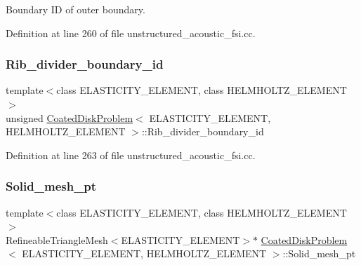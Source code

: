 Boundary ID of outer boundary. 



Definition at line 260 of file unstructured\+\_\+acoustic\+\_\+fsi.\+cc.

\mbox{\label{classCoatedDiskProblem_a0f241ef5043d002c90d68a93831e9212}} 
\subsubsection{\texorpdfstring{Rib\+\_\+divider\+\_\+boundary\+\_\+id}{Rib\_divider\_boundary\_id}}
{\footnotesize\ttfamily template$<$class E\+L\+A\+S\+T\+I\+C\+I\+T\+Y\+\_\+\+E\+L\+E\+M\+E\+NT, class H\+E\+L\+M\+H\+O\+L\+T\+Z\+\_\+\+E\+L\+E\+M\+E\+NT$>$ \\
unsigned \hyperlink{classCoatedDiskProblem}{Coated\+Disk\+Problem}$<$ E\+L\+A\+S\+T\+I\+C\+I\+T\+Y\+\_\+\+E\+L\+E\+M\+E\+NT, H\+E\+L\+M\+H\+O\+L\+T\+Z\+\_\+\+E\+L\+E\+M\+E\+NT $>$\+::Rib\+\_\+divider\+\_\+boundary\+\_\+id\hspace{0.3cm}{\ttfamily [private]}}



Definition at line 263 of file unstructured\+\_\+acoustic\+\_\+fsi.\+cc.

\mbox{\label{classCoatedDiskProblem_a9121e4e334b9570dd19c5b011b726eb7}} 
\subsubsection{\texorpdfstring{Solid\+\_\+mesh\+\_\+pt}{Solid\_mesh\_pt}\hspace{0.1cm}{\footnotesize\ttfamily [1/2]}}
{\footnotesize\ttfamily template$<$class E\+L\+A\+S\+T\+I\+C\+I\+T\+Y\+\_\+\+E\+L\+E\+M\+E\+NT, class H\+E\+L\+M\+H\+O\+L\+T\+Z\+\_\+\+E\+L\+E\+M\+E\+NT$>$ \\
Refineable\+Triangle\+Mesh$<$E\+L\+A\+S\+T\+I\+C\+I\+T\+Y\+\_\+\+E\+L\+E\+M\+E\+NT$>$$\ast$ \hyperlink{classCoatedDiskProblem}{Coated\+Disk\+Problem}$<$ E\+L\+A\+S\+T\+I\+C\+I\+T\+Y\+\_\+\+E\+L\+E\+M\+E\+NT, H\+E\+L\+M\+H\+O\+L\+T\+Z\+\_\+\+E\+L\+E\+M\+E\+NT $>$\+::Solid\+\_\+mesh\+\_\+pt\hspace{0.3cm}{\ttfamily [private]}}




